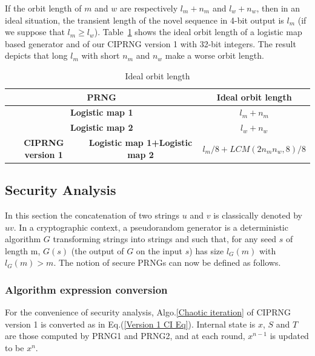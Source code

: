 If the orbit length of $m$ and $w$ are respectively $l_m+n_m$ and $l_w+n_w$, then in an ideal situation, the transient length of the novel sequence in 4-bit output is $l_m$ (if we suppose that
$l_m \geqslant l_w$).
Table~\ref{The ideal orbit length} shows the ideal orbit length of a logistic map 
based generator and of our CIPRNG version 1 with 32-bit integers. The result 
depicts that long $l_m$ with short $n_m$ and $n_w$ make a worse orbit length.

\begin{table}
\renewcommand{\arraystretch}{1.3}
\caption{Ideal orbit length}
\label{The ideal orbit length}
\centering
\begin{tabular}{|c|c|c|}\toprule\hline
\multicolumn{2}{|c|}{\textbf{PRNG}}&\textbf{Ideal orbit length}\\\hline
\multicolumn{2}{|c|}{\textbf{Logistic map 1}}& $l_m+n_m$\\\hline
\multicolumn{2}{|c|}{\textbf{Logistic map 2}}& $l_w+n_w$\\\hline
\textbf{CIPRNG version 1}&\textbf{Logistic map 1+Logistic map 2}&$l_m/8+LCM(2n_mn_w,8)/8$\\\hline
\bottomrule
\end{tabular}
\end{table}

\subsection{Security Analysis}
\label{Security Analysis Version 1 CI}
In this section the concatenation of two strings $u$ and $v$ is classically denoted by $uv$. In a cryptographic context, a pseudorandom generator is a deterministic algorithm $G$ transforming strings into strings and such that, for any seed $s$ of length m, $G(s)$ (the output of $G$ on the input $s$) has size $l_G(m)$ with $l_G(m) > m$. The notion of secure PRNGs can now be defined as follows. 

\subsubsection{Algorithm expression conversion}
For the convenience of security analysis,  Algo.\ref{Chaotic iteration} of CIPRNG version 1 is converted as in Eq.(\ref{Version 1 CI Eq}). Internal state is $x$, $S$ and $T$ are those computed by PRNG1 and PRNG2, and at each round, $x^{n-1}$ is updated to be $x^n$. 

